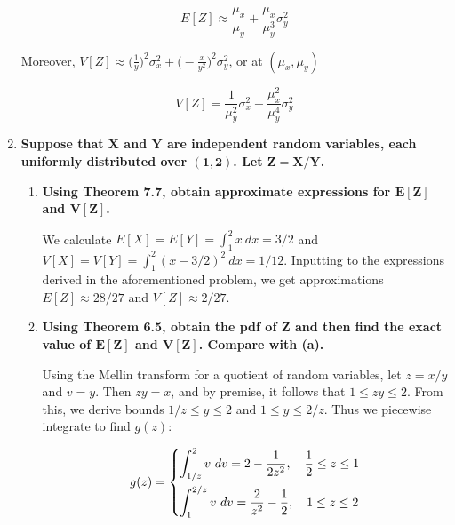 \documentclass[10pt, oneside]{article}   	%
\theoremstyle{definition}
\begin{document}
\begin{enumerate}[label=7.\arabic*]
  \[ \boxed{ E[Z] \approx \frac{\mu_x}{\mu_y} + \frac{\mu_x}{\mu^3_y} \sigma^2_y } \]
  
  Moreover, $V[Z] \approx \Big( \frac{1}{y} \Big)^2 \sigma^2_x + \Big( -\frac{x}{y^2} \Big)^2 \sigma^2_y$, or at $(\mu_x, \mu_y)$
  
  \[ \boxed{V[Z] = \frac{1}{\mu^2_y} \sigma^2_x + \frac{\mu^2_x}{\mu^4_y} \sigma^2_y } \]

\item  \begin{tcolorbox}[
  colback=Cerulean!5!white,
  colframe=Cerulean!75!black]
  \textbf{Suppose that $\bm{X}$ and $\bm{Y}$ are independent random variables, each uniformly distributed over $\bm{(1,2)}$. Let $\bm{Z = X/Y}$.}
  \end{tcolorbox}
  
  	\begin{enumerate}
	\item  \begin{tcolorbox}[
	  colback=Cerulean!5!white,
	  colframe=Cerulean!75!black]
	  \textbf{Using Theorem 7.7, obtain approximate expressions for $\bm{E[Z]}$ and $\bm{V[Z]}$.}
	  \end{tcolorbox}
	  
	  We calculate $E[X] = E[Y] = \int^2_1 x \ dx = 3/2$ and $V[X] = V[Y] = \int^2_1 (x - 3/2)^2 \ dx = 1/12$. Inputting to the expressions derived in the aforementioned problem, we get approximations $\boxed{E[Z] \approx 28/27}$ and $\boxed{V[Z] \approx 2/27}$.
	  
	\item  \begin{tcolorbox}[
	  colback=Cerulean!5!white,
	  colframe=Cerulean!75!black]
	  \textbf{Using Theorem 6.5, obtain the pdf of $\bm{Z}$ and then find the exact value of $\bm{E[Z]}$ and $\bm{V[Z]}$. Compare with (a).}
	  \end{tcolorbox}
	  
	  Using the Mellin transform for a quotient of random variables, let $z = x/y$ and $v = y$. Then $zy = x$, and by premise, it follows that $1 \leq zy \leq 2$. From this, we derive bounds $1/z \leq y \leq 2$ and $1 \leq y \leq 2/z$. Thus we piecewise integrate to find $g(z)$:
	  
	  \[ g(z) =
	  \begin{dcases}
	  \int^2_{1/z} v \ dv = 2 - \frac{1}{2z^2}, \quad \frac{1}{2} \leq z \leq 1 \\
	  \int^{2/z}_1 v \ dv = \frac{2}{z^2} - \frac{1}{2}, \quad 1 \leq z \leq 2
	  \end{dcases}
	  \]
	  

\end{enumerate}
\end{enumerate}
\end{document}
